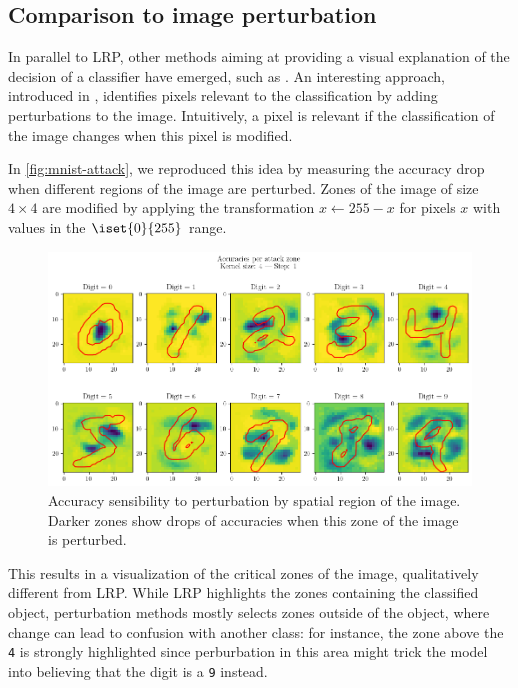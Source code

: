 \documentclass{../cs-classes/cs-classes}
\newcommand*{\1}{\digitsbb{1}}
\newcommand*{\0}{\digitsbb{0}}
\begin{document}
\subsection{Comparison to image perturbation}
In parallel to LRP, other methods aiming at providing a visual explanation of the decision of a classifier have emerged, such as \cite{inverting,visualizing-cnn}. An interesting approach, introduced in \cite{fong2017interpretable}, identifies pixels relevant to the classification by adding perturbations to the image. Intuitively, a pixel is relevant if the classification of the image changes when this pixel is modified. 

In \autoref{fig:mnist-attack}, we reproduced this idea by measuring the accuracy drop when different regions of the image are perturbed. Zones of the image of size $4\times4$ are modified by applying the transformation $x\longleftarrow255-x$ for pixels $x$ with values in the $\iset{0}{255}$ range. 
\begin{figure}[H]
    \centering
    \includegraphics[width=.8\textwidth]{attacks.png}
    \caption{Accuracy sensibility to perturbation by spatial region of the image. Darker zones show drops of accuracies when this zone of the image is perturbed.}
    \label{fig:mnist-attack}
\end{figure}
This results in a visualization of the critical zones of the image, qualitatively different from LRP. While LRP highlights the zones containing the classified object, perturbation methods mostly selects zones outside of the object, where change can lead to confusion with another class: for instance, the zone above the \texttt{4} is strongly highlighted since perburbation in this area might trick the model into believing that the digit is a \texttt{9} instead.
\end{document}
